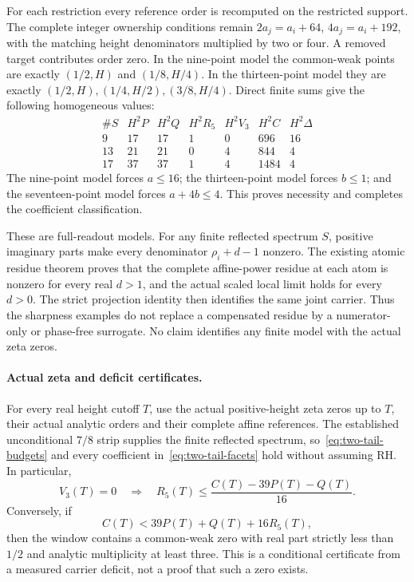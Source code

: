 For each restriction every reference order is recomputed on the restricted
support. The complete integer ownership conditions remain
\(2a_j=a_i+64\), \(4a_j=a_i+192\), with the matching height denominators
multiplied by two or four. A removed target contributes order zero.
In the nine-point model the common-weak points are exactly
\((1/2,H)\) and \((1/8,H/4)\). In the thirteen-point model they are
exactly \((1/2,H),(1/4,H/2),(3/8,H/4)\).
Direct finite sums give the following homogeneous values:
\[
 \begin{array}{c|rrrrrr}
 \#S&H^2P&H^2Q&H^2R_5&H^2V_3&H^2C&H^2\Delta\\ \hline
 9&17&17&1&0&696&16\\
 13&21&21&0&4&844&4\\
 17&37&37&1&4&1484&4
 \end{array}
\]
The nine-point model forces \(a\le16\); the thirteen-point model forces
\(b\le1\); and the seventeen-point model forces \(a+4b\le4\).
This proves necessity and completes the coefficient classification.

These are full-readout models. For any finite reflected spectrum \(S\),
positive imaginary parts make every denominator
\(\rho_i+d-1\) nonzero. The existing atomic residue theorem proves
that the complete affine-power residue at each atom is nonzero for every
real \(d>1\), and the actual scaled local limit holds for every \(d>0\).
The strict projection identity then identifies the same joint carrier.
Thus the sharpness examples do not replace a compensated residue by a
numerator-only or phase-free surrogate. No claim identifies any finite
model with the actual zeta zeros.

\paragraph{Actual zeta and deficit certificates.}
For every real height cutoff \(T\), use the actual positive-height zeta
zeros up to \(T\), their actual analytic orders and their complete affine
references. The established unconditional \(7/8\) strip supplies the
finite reflected spectrum, so~\eqref{eq:two-tail-budgets} and every
coefficient in~\eqref{eq:two-tail-facets} hold without assuming RH.
In particular,
\[
 V_3(T)=0\quad\Longrightarrow\quad
 R_5(T)\le\frac{C(T)-39P(T)-Q(T)}{16}.
\]
Conversely, if
\[
 C(T)<39P(T)+Q(T)+16R_5(T),
\]
then the window contains a common-weak zero with real part strictly
less than \(1/2\) and analytic multiplicity at least three.
This is a conditional certificate from a measured carrier deficit,
not a proof that such a zero exists.

